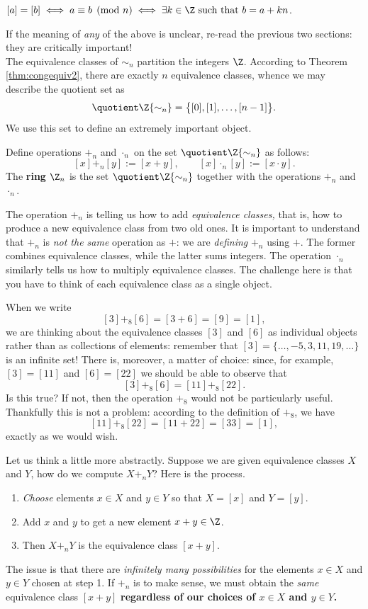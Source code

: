 \begin{thm}\label{thm:congequiv2}
$[a]=[b]\iff a\equiv b\pmod n\iff \exists k\in\Z\text{ such that }b=a+kn$.
\end{thm}

\noindent If the meaning of \emph{any} of the above is unclear, re-read the previous two sections: they are critically important!\\
The equivalence classes of $\sim_n$ partition the integers $\Z$. According to Theorem \ref{thm:congequiv2}, there are exactly $n$ equivalence classes, whence we may describe the quotient set as
\[\quotient \Z{\sim_n}=\big\{[0],[1],\ldots,[n-1]\big\}.\]
We use this set to define an extremely important object.

\begin{defn}
Define operations $+_n$ and $\cdot_n$ on the set $\quotient\Z{\sim_n}$ as follows:
\[[x]+_n[y]:=[x+y],\qquad [x]\cdot_n[y]:=[x\cdot y].\]
The \textbf{ring} $\Z_n$ is the set $\quotient\Z{\sim_n}$ together with the operations $+_n$ and $\cdot_n$.
\end{defn}

\noindent The operation $+_n$ is telling us how to add \emph{equivalence classes,} that is, how to produce a new equivalence class from two old ones. It is important to understand that $+_n$ is \emph{not the same} operation as $+$: we are \emph{defining} $+_n$ using $+$. The former combines equivalence classes, while the latter sums integers. The operation $\cdot_n$ similarly tells us how to multiply equivalence classes. The challenge here is that you have to think of each equivalence class as a single object. 

\begin{example}
When we write
\[[3]+_8[6]=[3+6]=[9]=[1],\]
we are thinking about the equivalence classes $[3]$ and $[6]$ as individual objects rather than as collections of elements: remember that $[3]=\{\ldots,-5,3,11,19,\ldots\}$ is an infinite set! There is, moreover, a matter of choice: since, for example, $[3]=[11]$ and $[6]=[22]$ we should be able to observe that
\[[3]+_8[6]=[11]+_8[22].\]
Is this true? If not, then the operation $+_8$ would not be particularly useful. Thankfully this is not a problem: according to the definition of $+_8$, we have
\[[11]+_8[22]=[11+22]=[33]=[1],\]
exactly as we would wish.
\end{example}

Let us think a little more abstractly. Suppose we are given equivalence classes $X$ and $Y$, how do we compute $X+_nY$? Here is the process.
\begin{enumerate}
  \item \emph{Choose} elements $x\in X$ and $y\in Y$ so that $X=[x]$ and $Y=[y]$.
  \item Add $x$ and $y$ to get a new element $x+y\in\Z$.
  \item Then $X+_nY$ is the equivalence class $[x+y]$.
\end{enumerate}
The issue is that there are \emph{infinitely many possibilities} for the elements $x\in X$ and $y\in Y$ chosen at step 1. If $+_n$ is to make sense, we must obtain the \emph{same} equivalence class $[x+y]$ {\bf regardless of our choices of $x\in X$ and $y\in Y$.}

